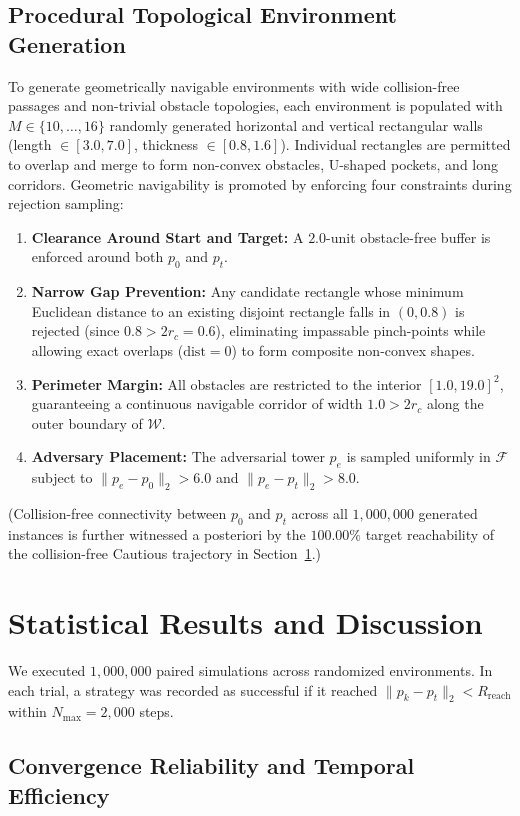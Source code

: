 \documentclass[12pt, a4paper]{article}
\begin{document}
\subsection{Procedural Topological Environment Generation}
To generate geometrically navigable environments with wide collision-free passages and non-trivial obstacle topologies, each environment is populated with $M \in \{10, \dots, 16\}$ randomly generated horizontal and vertical rectangular walls (length $\in [3.0, 7.0]$, thickness $\in [0.8, 1.6]$). Individual rectangles are permitted to overlap and merge to form non-convex obstacles, U-shaped pockets, and long corridors. Geometric navigability is promoted by enforcing four constraints during rejection sampling:
\begin{enumerate}
    \item \textbf{Clearance Around Start and Target:} A $2.0$-unit obstacle-free buffer is enforced around both $p_0$ and $p_t$.
    \item \textbf{Narrow Gap Prevention:} Any candidate rectangle whose minimum Euclidean distance to an existing disjoint rectangle falls in $(0, 0.8)$ is rejected (since $0.8 > 2r_c = 0.6$), eliminating impassable pinch-points while allowing exact overlaps ($\text{dist} = 0$) to form composite non-convex shapes.
    \item \textbf{Perimeter Margin:} All obstacles are restricted to the interior $[1.0, 19.0]^2$, guaranteeing a continuous navigable corridor of width $1.0 > 2r_c$ along the outer boundary of $\mathcal{W}$.
    \item \textbf{Adversary Placement:} The adversarial tower $p_e$ is sampled uniformly in $\mathcal{F}$ subject to $\|p_e - p_0\|_2 > 6.0$ and $\|p_e - p_t\|_2 > 8.0$.
\end{enumerate}
(Collision-free connectivity between $p_0$ and $p_t$ across all $1,000,000$ generated instances is further witnessed a posteriori by the $100.00\%$ target reachability of the collision-free Cautious trajectory in Section~\ref{sec:results}.)

\section{Statistical Results and Discussion}
\label{sec:results}
We executed $1,000,000$ paired simulations across randomized environments. In each trial, a strategy was recorded as successful if it reached $\|p_k - p_t\|_2 < R_{\text{reach}}$ within $N_{\max} = 2,000$ steps.

\subsection{Convergence Reliability and Temporal Efficiency}
\end{document}

